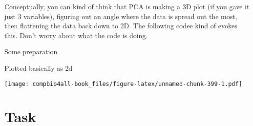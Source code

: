 \documentclass[
]{book}
\newenvironment{Shaded}{\begin{snugshade}}{\end{snugshade}}
\newcommand{\AttributeTok}[1]{\textcolor[rgb]{0.77,0.63,0.00}{#1}}
\newcommand{\ConstantTok}[1]{\textcolor[rgb]{0.00,0.00,0.00}{#1}}
\newcommand{\DecValTok}[1]{\textcolor[rgb]{0.00,0.00,0.81}{#1}}
\newcommand{\DocumentationTok}[1]{\textcolor[rgb]{0.56,0.35,0.01}{\textbf{\textit{#1}}}}
\newcommand{\FunctionTok}[1]{\textcolor[rgb]{0.00,0.00,0.00}{#1}}
\newcommand{\NormalTok}[1]{#1}
\newcommand{\OtherTok}[1]{\textcolor[rgb]{0.56,0.35,0.01}{#1}}
\newcommand{\SpecialCharTok}[1]{\textcolor[rgb]{0.00,0.00,0.00}{#1}}
\begin{document}
Conceptually, you can kind of think that PCA is making a 3D plot (if you gave it just 3 variables), figuring out an angle where the data is spread out the most, then flattening the data back down to 2D. The following codee kind of evokes this. Don't worry about what the code is doing.

Some preparation

\begin{Shaded}
\end{Shaded}

Plotted basically as 2d

\begin{Shaded}
\end{Shaded}

\texttt{[image: compbio4all-book\_files/figure-latex/unnamed-chunk-399-1.pdf]}

\hypertarget{task-3}{%
\section{Task}\label{task-3}}
\end{document}
